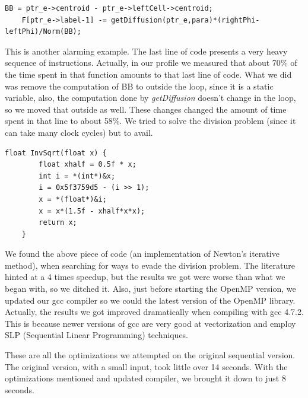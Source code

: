 \documentclass[a4paper,10pt,openright,openbib,twocolumn]{article}
\begin{document}
\begin{minipage}{.45\textwidth}
\lstset{
    language=C++,
    basicstyle=\ttfamily\small,
    breaklines=true
}
\begin{lstlisting}[caption=Another excerpt from makeFlux]    
    BB = ptr_e->centroid - ptr_e->leftCell->centroid;
    F[ptr_e->label-1] -= getDiffusion(ptr_e,para)*(rightPhi-leftPhi)/Norm(BB); 
\end{lstlisting}
\end{minipage}    

This is another alarming example. The last line of code presents a very heavy sequence of instructions. Actually, in our profile we measured that about 70\% of the time spent in that function amounts to that last line of code. What we did was remove the computation of BB to outside the loop, since it is a static variable, also, the computation done by \emph{getDiffusion} doesn't change in the loop, so we moved that outside as well. These changes changed the amount of time spent in that line to about 58\%. 
We tried to solve the division problem (since it can take many clock cycles) but to avail.

\begin{minipage}{.45\textwidth}
\lstset{
    language=C++,
    basicstyle=\ttfamily\small,
    breaklines=true
}
\begin{lstlisting}[caption=Fast Square-Root]    
    float InvSqrt(float x) {
        float xhalf = 0.5f * x;
        int i = *(int*)&x;
        i = 0x5f3759d5 - (i >> 1);
        x = *(float*)&i;
        x = x*(1.5f - xhalf*x*x);
        return x;
    }
\end{lstlisting}
\end{minipage} 

We found the above piece of code (an implementation of Newton's iterative method), when searching for ways to evade the division problem. The literature hinted at a 4 times speedup, but the results we got were worse than what we began with, so we ditched it.  
Also, just before starting the OpenMP version, we updated our gcc compiler so we could the latest version of the OpenMP library. Actually, the results we got improved dramatically when compiling with gcc 4.7.2. This is because newer versions of gcc are very good at vectorization and employ SLP (Sequential Linear Programming) techniques.

These are all the optimizations we attempted on the original sequential version. The original version, with a small input, took little over 14 seconds. With the optimizations mentioned and updated compiler, we brought it down to just 8 seconds. 
\end{document}
